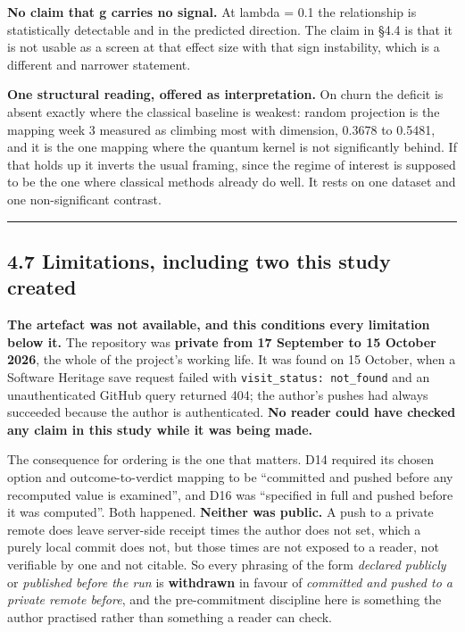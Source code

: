 \documentclass[
  10pt,
]{article}
\begin{document}
\textbf{No claim that g carries no signal.} At lambda = 0.1 the
relationship is statistically detectable and in the predicted direction.
The claim in \S{}4.4 is that it is not usable as a screen at that effect
size with that sign instability, which is a different and narrower
statement.

\textbf{One structural reading, offered as interpretation.} On churn the
deficit is absent exactly where the classical baseline is weakest:
random projection is the mapping week 3 measured as climbing most with
dimension, 0.3678 to 0.5481, and it is the one mapping where the quantum
kernel is not significantly behind. If that holds up it inverts the
usual framing, since the regime of interest is supposed to be the one
where classical methods already do well. It rests on one dataset and one
non-significant contrast.

\begin{center}\rule{0.5\linewidth}{0.5pt}\end{center}

\subsection{4.7 Limitations, including two this study
created}\label{limitations-including-two-this-study-created}

\textbf{The artefact was not available, and this conditions every
limitation below it.} The repository was \textbf{private from 17
September to 15 October 2026}, the whole of the project's working life.
It was found on 15 October, when a Software Heritage save request failed
with \texttt{visit\_\allowbreak{}status:\ not\_\allowbreak{}found} and an unauthenticated GitHub
query returned 404; the author's pushes had always succeeded because the
author is authenticated. \textbf{No reader could have checked any claim
in this study while it was being made.}

The consequence for ordering is the one that matters. D14 required its
chosen option and outcome-to-verdict mapping to be ``committed and
pushed before any recomputed value is examined'', and D16 was
``specified in full and pushed before it was computed''. Both happened.
\textbf{Neither was public.} A push to a private remote does leave
server-side receipt times the author does not set, which a purely local
commit does not, but those times are not exposed to a reader, not
verifiable by one and not citable. So every phrasing of the form
\emph{declared publicly} or \emph{published before the run} is
\textbf{withdrawn} in favour of \emph{committed and pushed to a private
remote before}, and the pre-commitment discipline here is something the
author practised rather than something a reader can check.
\end{document}
